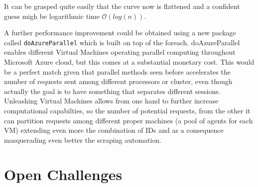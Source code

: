 \documentclass[
  12pt,
  a4paper,
  oneside]{book}
\begin{document}
It can be grasped quite easily that the curve now is flattened and a confident guess migh be logarithmic time \(\mathcal{O}(log(n))\).

A further performance improvement could be obtained using a new package called \texttt{doAzureParallel} which is built on top of the foreach. doAzureParallel enables different Virtual Machines operating parallel computing throughout Microsoft Azure cloud, but this comes at a substantial monetary cost. This would be a perfect match given that parallel methods seen before accelerates the number of requests sent among different processors or cluster, even though actually the goal is to have something that separates different sessions. Unleashing Virtual Machines allows from one hand to further increase computational capabilties, so the number of potential requests, from the other it can partition requests among different proper machines (a pool of agents for each VM) extending even more the combination of IDs and as a consequence masquerading even better the scraping automation.

\hypertarget{challenges}{%
\section{Open Challenges}\label{challenges}}
\end{document}
